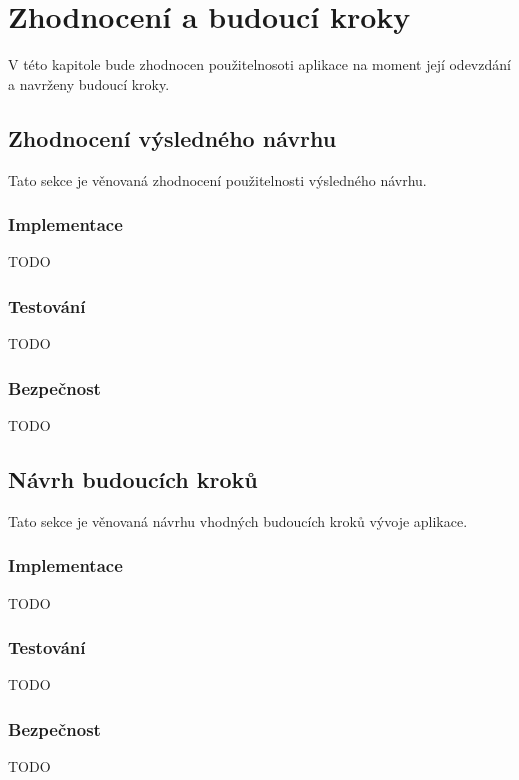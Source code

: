 \chapter{Zhodnocení a budoucí kroky}
V této kapitole bude zhodnocen použitelnosoti aplikace na moment její odevzdání a navrženy budoucí kroky.
\section{Zhodnocení výsledného návrhu}
    Tato sekce je věnovaná zhodnocení použitelnosti výsledného návrhu. 
    \subsection{Implementace}
        TODO
    \subsection{Testování}
        TODO
    \subsection{Bezpečnost}
        TODO

\section{Návrh budoucích kroků}
    Tato sekce je věnovaná návrhu vhodných budoucích kroků vývoje aplikace.
    \subsection{Implementace}
        TODO
    \subsection{Testování}
        TODO
    \subsection{Bezpečnost}
        TODO
